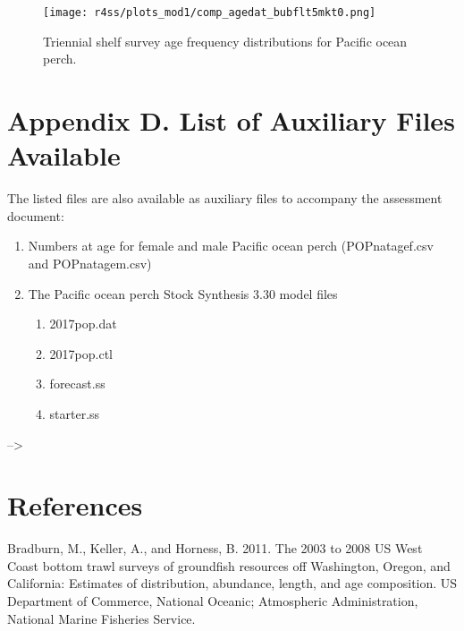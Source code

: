 \documentclass[12pt,]{article}
\begin{document}
\FloatBarrier

\begin{figure}
\centering
\texttt{[image: r4ss/plots\_mod1/comp\_agedat\_bubflt5mkt0.png]}
\caption{Triennial shelf survey age frequency distributions for Pacific
ocean perch. \label{fig:Tri_Age}}
\end{figure}

\FloatBarrier

\newpage

\section{Appendix D. List of Auxiliary Files
Available}\label{appendix-d.-list-of-auxiliary-files-available}

The listed files are also available as auxiliary files to accompany the
assessment document:

\begin{enumerate}
  \item Numbers at age for female and male Pacific ocean perch (POPnatagef.csv and POPnatagem.csv)
  \item The Pacific ocean perch Stock Synthesis 3.30 model files
  
  \begin{enumerate}
    \item 2017pop.dat
    \item 2017pop.ctl
    \item forecast.ss
    \item starter.ss
  \end{enumerate}
\end{enumerate}

\newpage

--\textgreater{} \color{black}

\section{References}\label{references}

\renewcommand{\thepage}{}

\hypertarget{refs}{}
\hypertarget{ref-bradburn_2003_2011}{}
Bradburn, M., Keller, A., and Horness, B. 2011. The 2003 to 2008 US West
Coast bottom trawl surveys of groundfish resources off Washington,
Oregon, and California: Estimates of distribution, abundance, length,
and age composition. US Department of Commerce, National Oceanic;
Atmospheric Administration, National Marine Fisheries Service.
\end{document}
